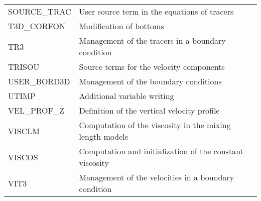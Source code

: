 \begin{tabular}{p{2.5in}p{4.0in}}
SOURCE\_TRAC & User source term in the equations of tracers\\
T3D\_CORFON  &  Modification of bottoms\\
TR3    & Management of the tracers in a boundary condition\\
TRISOU &  Source terms for the velocity components\\
USER\_BORD3D &  Management of the boundary conditions\\
UTIMP  &  Additional variable writing\\
VEL\_PROF\_Z & Definition of the vertical velocity profile\\
VISCLM  & Computation of the viscosity in the mixing length models\\
VISCOS  &  Computation and initialization of the constant viscosity\\
VIT3    &  Management of the velocities in a boundary condition\\
\end{tabular}
